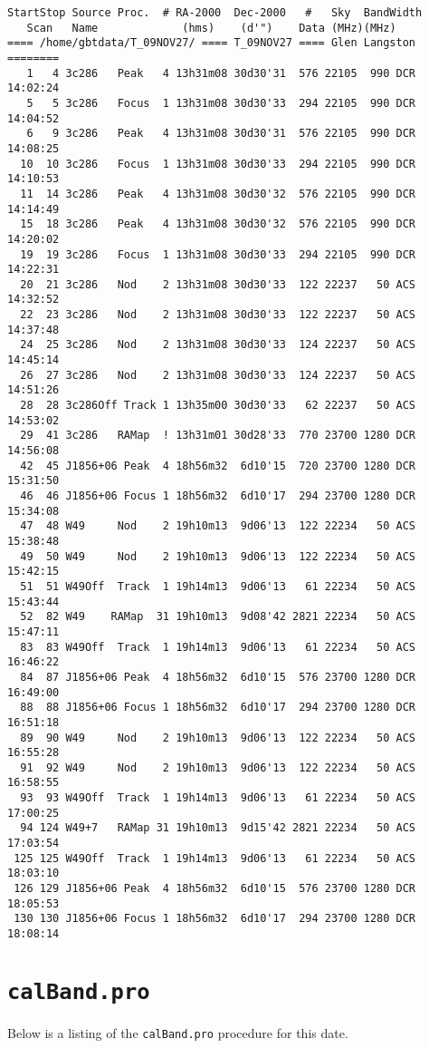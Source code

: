 \documentclass[12pt,twoside]{article}
\begin{document}
\begin{verbatim}
StartStop Source Proc.  # RA-2000  Dec-2000   #   Sky  BandWidth
   Scan   Name             (hms)    (d'")    Data (MHz)(MHz)
==== /home/gbtdata/T_09NOV27/ ==== T_09NOV27 ==== Glen Langston ========
   1   4 3c286   Peak   4 13h31m08 30d30'31  576 22105  990 DCR 14:02:24
   5   5 3c286   Focus  1 13h31m08 30d30'33  294 22105  990 DCR 14:04:52
   6   9 3c286   Peak   4 13h31m08 30d30'31  576 22105  990 DCR 14:08:25
  10  10 3c286   Focus  1 13h31m08 30d30'33  294 22105  990 DCR 14:10:53
  11  14 3c286   Peak   4 13h31m08 30d30'32  576 22105  990 DCR 14:14:49
  15  18 3c286   Peak   4 13h31m08 30d30'32  576 22105  990 DCR 14:20:02
  19  19 3c286   Focus  1 13h31m08 30d30'33  294 22105  990 DCR 14:22:31
  20  21 3c286   Nod    2 13h31m08 30d30'33  122 22237   50 ACS 14:32:52
  22  23 3c286   Nod    2 13h31m08 30d30'33  122 22237   50 ACS 14:37:48
  24  25 3c286   Nod    2 13h31m08 30d30'33  124 22237   50 ACS 14:45:14
  26  27 3c286   Nod    2 13h31m08 30d30'33  124 22237   50 ACS 14:51:26
  28  28 3c286Off Track 1 13h35m00 30d30'33   62 22237   50 ACS 14:53:02
  29  41 3c286   RAMap  ! 13h31m01 30d28'33  770 23700 1280 DCR 14:56:08
  42  45 J1856+06 Peak  4 18h56m32  6d10'15  720 23700 1280 DCR 15:31:50
  46  46 J1856+06 Focus 1 18h56m32  6d10'17  294 23700 1280 DCR 15:34:08
  47  48 W49     Nod    2 19h10m13  9d06'13  122 22234   50 ACS 15:38:48
  49  50 W49     Nod    2 19h10m13  9d06'13  122 22234   50 ACS 15:42:15
  51  51 W49Off  Track  1 19h14m13  9d06'13   61 22234   50 ACS 15:43:44
  52  82 W49    RAMap  31 19h10m13  9d08'42 2821 22234   50 ACS 15:47:11
  83  83 W49Off  Track  1 19h14m13  9d06'13   61 22234   50 ACS 16:46:22
  84  87 J1856+06 Peak  4 18h56m32  6d10'15  576 23700 1280 DCR 16:49:00
  88  88 J1856+06 Focus 1 18h56m32  6d10'17  294 23700 1280 DCR 16:51:18
  89  90 W49     Nod    2 19h10m13  9d06'13  122 22234   50 ACS 16:55:28
  91  92 W49     Nod    2 19h10m13  9d06'13  122 22234   50 ACS 16:58:55
  93  93 W49Off  Track  1 19h14m13  9d06'13   61 22234   50 ACS 17:00:25
  94 124 W49+7   RAMap 31 19h10m13  9d15'42 2821 22234   50 ACS 17:03:54
 125 125 W49Off  Track  1 19h14m13  9d06'13   61 22234   50 ACS 18:03:10
 126 129 J1856+06 Peak  4 18h56m32  6d10'15  576 23700 1280 DCR 18:05:53
 130 130 J1856+06 Focus 1 18h56m32  6d10'17  294 23700 1280 DCR 18:08:14
\end{verbatim}
\section{\tt calBand.pro}
Below is a listing of the {\tt calBand.pro} procedure for this date.
\end{document}
